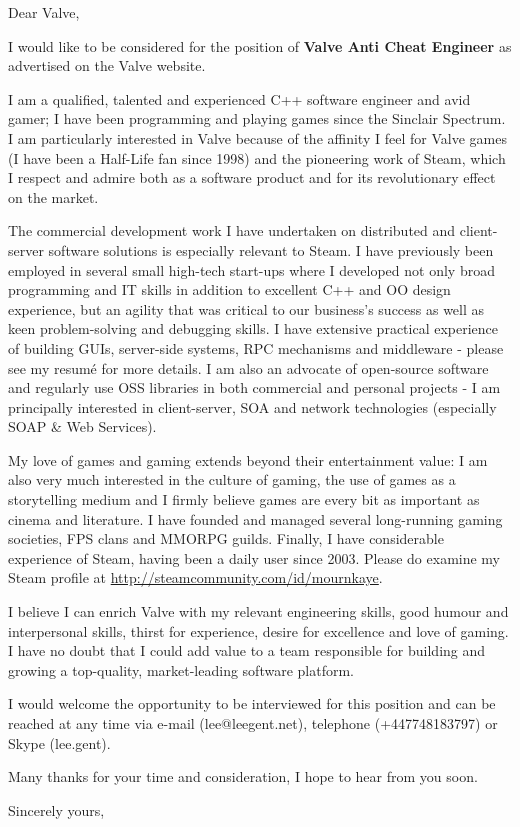 \documentclass[a4paper,11pt]{letter}
\begin{document}
\begin{letter}{}
\opening{Dear Valve,}

I would like to be considered for the position of {\bf Valve Anti Cheat Engineer} as advertised on the Valve website.

I am a qualified, talented and experienced C++ software engineer and avid gamer; I have been programming and playing games since the Sinclair Spectrum.  I am particularly interested in Valve because of the affinity I feel for Valve games (I have been a Half-Life fan since 1998) and the pioneering work of Steam, which I respect and admire both as a software product and for its revolutionary effect on the market.

The commercial development work I have undertaken on distributed and client-server software solutions is especially relevant to Steam.  I have previously been employed in several small high-tech start-ups where I developed not only broad programming and IT skills in addition to excellent C++ and OO design experience, but an agility that was critical to our business's success as well as keen problem-solving and debugging skills.  I have extensive practical experience of building GUIs, server-side systems, RPC mechanisms and middleware - please see my resum\'{e} for more details.  I am also an advocate of open-source software and regularly use OSS libraries in both commercial and personal projects - I am principally interested in client-server, SOA and network technologies (especially SOAP \& Web Services).

My love of games and gaming extends beyond their entertainment value: I am also very much interested in the culture of gaming, the use of games as a storytelling medium and I firmly believe games are every bit as important as cinema and literature.  I have founded and managed several long-running gaming societies, FPS clans and MMORPG guilds.  Finally, I have considerable experience of Steam, having been a daily user since 2003.  Please do examine my Steam profile at \url{http://steamcommunity.com/id/mournkaye}.

I believe I can enrich Valve with my relevant engineering skills, good humour and interpersonal skills, thirst for experience, desire for excellence and love of gaming.  I have no doubt that I could add value to a team responsible for building and growing a top-quality, market-leading software platform.

I would welcome the opportunity to be interviewed for this position and can be reached at any time via e-mail (lee@leegent.net), telephone (+447748183797) or Skype (lee.gent).

Many thanks for your time and consideration, I hope to hear from you soon.
\closing{Sincerely yours,\\
 \\
}
\end{letter}
\end{document}
